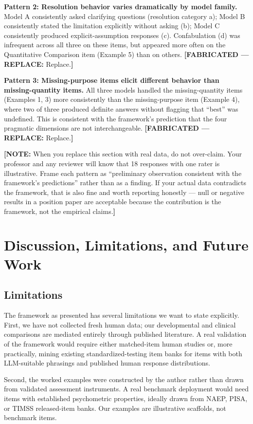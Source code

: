 \documentclass[11pt,letterpaper]{article}
\newcommand{\fabricated}[1]{{\color{red}\textbf{[FABRICATED --- REPLACE:} #1\textbf{]}}}
\newcommand{\todonote}[1]{{\color{violet}\textbf{[NOTE:} #1\textbf{]}}}
\begin{document}
\textbf{Pattern 2: Resolution behavior varies dramatically by model family.} Model A consistently asked clarifying questions (resolution category a); Model B consistently stated the limitation explicitly without asking (b); Model C consistently produced explicit-assumption responses (c). Confabulation (d) was infrequent across all three on these items, but appeared more often on the Quantitative Comparison item (Example 5) than on others. \fabricated{Replace.}

\textbf{Pattern 3: Missing-purpose items elicit different behavior than missing-quantity items.} All three models handled the missing-quantity items (Examples 1, 3) more consistently than the missing-purpose item (Example 4), where two of three produced definite answers without flagging that ``best'' was undefined. This is consistent with the framework's prediction that the four pragmatic dimensions are not interchangeable. \fabricated{Replace.}

\todonote{When you replace this section with real data, do not over-claim. Your professor and any reviewer will know that 18 responses with one rater is illustrative. Frame each pattern as ``preliminary observation consistent with the framework's predictions'' rather than as a finding. If your actual data contradicts the framework, that is also fine and worth reporting honestly --- null or negative results in a position paper are acceptable because the contribution is the framework, not the empirical claims.}

\section{Discussion, Limitations, and Future Work}
\label{sec:discussion}

\subsection{Limitations}

The framework as presented has several limitations we want to state explicitly. First, we have not collected fresh human data; our developmental and clinical comparisons are mediated entirely through published literature. A real validation of the framework would require either matched-item human studies or, more practically, mining existing standardized-testing item banks for items with both LLM-suitable phrasings and published human response distributions.

Second, the worked examples were constructed by the author rather than drawn from validated assessment instruments. A real benchmark deployment would need items with established psychometric properties, ideally drawn from NAEP, PISA, or TIMSS released-item banks. Our examples are illustrative scaffolds, not benchmark items.
\end{document}
